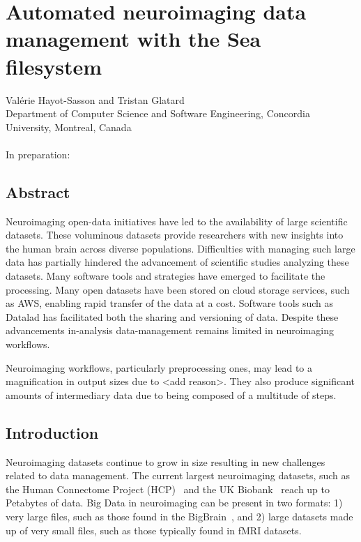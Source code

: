 \chapter{Automated neuroimaging data management with the Sea filesystem}

Val\'erie Hayot-Sasson and Tristan Glatard \\
\begingroup \footnotesize
Department of Computer Science and Software Engineering, Concordia University, Montreal, Canada \\
\endgroup 
\vspace{5pt} \\
In preparation: \\

\section{Abstract}
	Neuroimaging open-data initiatives have led to the availability of large scientific datasets. These voluminous
	datasets provide researchers with new insights into the human brain across diverse populations. Difficulties with
	managing such large data has partially hindered the advancement of scientific studies analyzing these datasets. Many
	software tools and strategies have emerged to facilitate the processing. Many open datasets have been stored on cloud storage
	services, such as AWS, enabling rapid transfer of the data at a cost. Software tools such as Datalad has facilitated both the
	sharing and versioning of data. Despite these advancements in-analysis data-management remains limited in neuroimaging workflows.
    
	Neuroimaging workflows, particularly preprocessing ones, may lead to a magnification in output sizes due to <add reason>. They also produce
	significant amounts of intermediary data due to being composed of a multitude of steps. 
    
    \section{Introduction}\label{sec:sea_neuro:introduction}
    
    Neuroimaging datasets continue to grow in size resulting in new challenges related
    to data management. The current largest neuroimaging datasets, such as the Human Connectome Project (HCP)~\cite{HCP}
    and the UK Biobank~\cite{ukbiobank} reach up to Petabytes of data. Big Data in neuroimaging can be present in two formats: 1)
    very large files, such as those found in the BigBrain~\cite{bigbrain}, and 2) large datasets made up of very small files,
    such as those typically found in fMRI datasets. 
    
